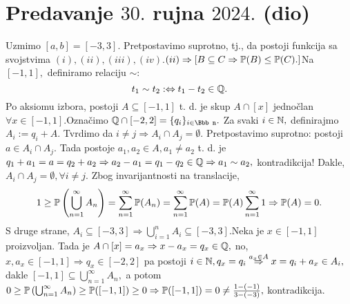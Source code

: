 \documentclass{article}
\begin{document}
\newpage
\section{Predavanje \(30.\) rujna \(2024.\) (dio)}
Uzmimo \([a,b]=[-3,3].\) Pretpostavimo suprotno, tj., da postoji funkcija sa svojstvima \((i),(ii),(iii),(iv).\)\newline \((ii)\Rightarrow[B\subseteq C\Rightarrow\Bbb P(B)\le\Bbb P(C).]\)\newline Na \([-1,1],\) definiramo relaciju \(\sim:\) \[t_1\sim t_2:\Leftrightarrow t_1-t_2\in\Bbb Q.\] Po aksiomu izbora, postoji \(A\subseteq[-1,1]\) t. d. je skup \(A\cap[x]\) jednočlan \(\forall x\in[-1,1].\)\newline Označimo \(\Bbb Q\cap[-2,2]=\{q_i\}_{i\in\Bbb n}.\) Za svaki \(i\in\Bbb N,\) definirajmo \(A_i:=q_i+A.\) Tvrdimo da \(i\ne j\Rightarrow A_i\cap A_j=\emptyset.\) Pretpostavimo suprotno: postoji \(a\in A_i\cap A_j.\) Tada postoje \(a_1,a_2\in A,a_1\ne a_2\) t. d. je \(q_1+a_1=a=q_2+a_2\Rightarrow a_2-a_1=q_1-q_2\in\Bbb Q\Rightarrow a_1\sim a_2,\) kontradikcija! Dakle, \(A_i\cap A_j=\emptyset,\forall i\ne j.\) Zbog invarijantnosti na translacije, \[1\ge\Bbb P\left(\bigcup_{n=1}^\infty A_n\right)=\sum_{n=1}^\infty\Bbb P(A_n)=\sum_{n=1}^\infty\Bbb P(A)=\Bbb P(A)\sum_{n=1}^\infty 1\Rightarrow\Bbb P(A)=0.\] S druge strane, \(A_i\subseteq[-3,3]\Rightarrow\bigcup_{i=1}^nA_i\subseteq[-3,3].\)\newline Neka je \(x\in[-1,1]\) proizvoljan. Tada je \(A\cap[x]=a_x\Rightarrow x-a_x=q_x\in\Bbb Q,\) no, \(x,a_x\in[-1,1]\Rightarrow q_x\in[-2,2]\) pa postoji \(i\in\Bbb N,q_x=q_i\overset{a_x\in A}{\Rightarrow} x=q_i+a_x\in A_i,\) dakle \([-1,1]\subseteq\bigcup_{n=1}^\infty A_n,\) a potom \(0\ge\Bbb P\left(\bigcup_{n=1}^\infty A_n\right)\ge\Bbb P([-1,1])\ge 0\Rightarrow\Bbb P([-1,1])=0\ne\frac{1-(-1)}{3-(-3)},\) kontradikcija.
\newpage
\end{document}
